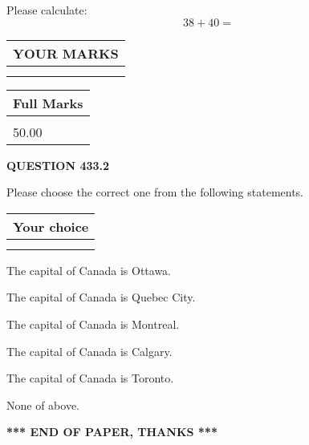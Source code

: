 \documentclass[12pt]{article}
\begin{document}
  
 
Please calculate:
\begin{equation}
38 +  %
40 = \nonumber
\end{equation}
 

 

 
  
\vspace{0.2in}
  
\noindent\begin{tabular}{|l|}
\hline
 YOUR MARKS  \\
\hline
 \\ 
 \\ 
\hline
\end{tabular}
\hspace{0.05in} \begin{tabular}{|l|}
\hline
 Full Marks  \\
\hline
 \\ 
50.00 \\
\hline
\end{tabular}
{\textbf{\Large{QUESTION
433.2 
}}}
  
  
Please choose the correct one from the following statements.
  
  
\noindent\hspace{3.0in} \begin{tabular}{|l|}
\hline
Your choice \\
\hline
 \\ 
 \\ 
\hline
\end{tabular}
  
  
 
 
The capital of Canada is Ottawa.
 
 
The capital of Canada is Quebec City.
 
 
The capital of Canada is Montreal.
 
 
The capital of Canada is Calgary.
 
 
The capital of Canada is Toronto.
 
 
 None of above.
 
 
   
   
 \vspace{0.2in}
 
   
   
   
   
\vspace{1.0in} 
{\textbf{\large{ *** END OF PAPER, THANKS *** }}} 
   
\end{document}
